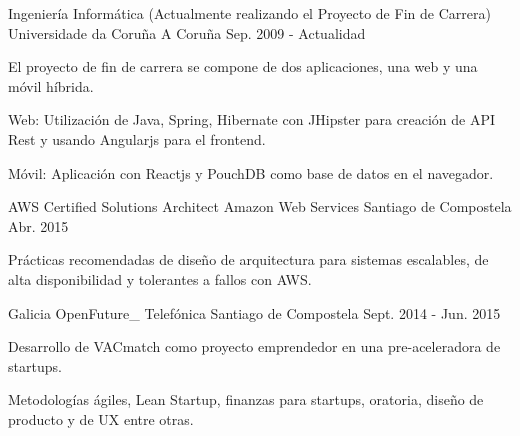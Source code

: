 


\begin{cventries}


\cventry
{Ingeniería Informática (Actualmente realizando el Proyecto de Fin de Carrera)} %
{Universidade da Coruña} %
{A Coruña} %
{Sep. 2009 - Actualidad} %
{ %
\begin{cvitems}
\item {El proyecto de fin de carrera se compone de dos aplicaciones, una web y una móvil híbrida.}
\item {Web: Utilización de Java, Spring, Hibernate con JHipster para creación de API Rest y usando Angularjs para el frontend.}
\item {Móvil: Aplicación con Reactjs y PouchDB como base de datos en el navegador.}
\end{cvitems}
}


\cventry
{AWS Certified Solutions Architect} %
{Amazon Web Services} %
{Santiago de Compostela} %
{Abr. 2015} %
{ %
\begin{cvitems}
\item {Prácticas recomendadas de diseño de arquitectura para sistemas escalables, de alta disponibilidad y tolerantes a fallos con AWS.}
\end{cvitems}
}



\cventry
{Galicia OpenFuture\_} %
{Telefónica} %
{Santiago de Compostela} %
{Sept. 2014 - Jun. 2015} %
{ %
\begin{cvitems}
\item {Desarrollo de VACmatch como proyecto emprendedor en una pre-aceleradora de startups.}
\item {Metodologías ágiles, Lean Startup, finanzas para startups, oratoria, diseño de producto y de UX entre otras.}
\end{cvitems}
}


\end{cventries}
